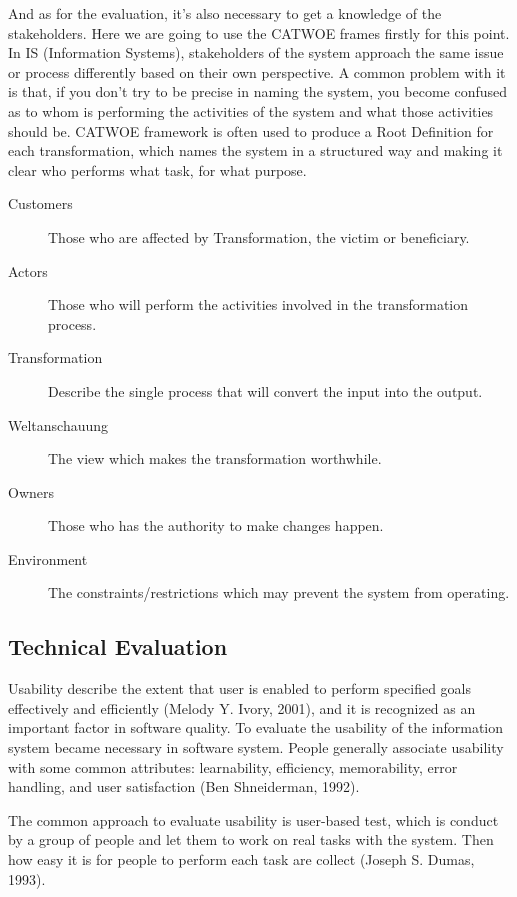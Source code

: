 \documentclass[twocolumn]{article}
\begin{document}
And as for the evaluation, it's also necessary to get a knowledge of the stakeholders. Here we are going to use the CATWOE frames firstly for this point. In IS (Information Systems), stakeholders of the system approach the same issue or process differently based on their own perspective. A common problem with it is that, if you don’t try to be precise in naming the system, you become confused as to whom is performing the activities of the system and what those activities should be. CATWOE framework is often used to produce a Root Definition for each transformation, which names the system in a structured way and making it clear who performs what task, for what purpose.

\begin{description}
  \item[Customers]
    Those who are affected by Transformation, the victim or beneficiary.
  \item[Actors]
    Those who will perform the activities involved in the transformation process.
  \item[Transformation]
    Describe the single process that will convert the input into the output.
  \item[Weltanschauung]
    The view which makes the transformation worthwhile.
  \item[Owners]
    Those who has the authority to make changes happen.
  \item[Environment]
    The constraints/restrictions which may prevent the system from operating.
\end{description}

\subsection{Technical Evaluation}
Usability describe the extent that user is enabled to perform specified goals effectively and efficiently (Melody Y. Ivory, 2001), and it is recognized as an important factor in software quality. To evaluate the usability of the information system became necessary in software system. People generally associate usability with some common attributes: learnability, efficiency, memorability, error handling, and user satisfaction (Ben Shneiderman, 1992). 

The common approach to evaluate usability is user-based test, which is conduct by a group of people and let them to work on real tasks with the system. Then how easy it is for people to perform each task are collect (Joseph S. Dumas, 1993).
\end{document}
